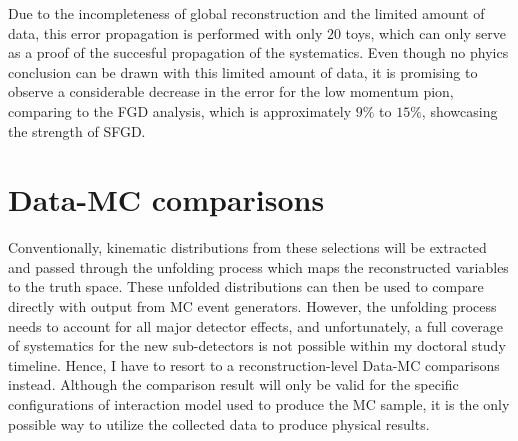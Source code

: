           Due to the incompleteness of global reconstruction and the limited amount of data, this error propagation is performed with only $20$ toys, which can only serve as a proof of the succesful propagation of the systematics.
          Even though no phyics conclusion can be drawn with this limited amount of data, it is promising to observe a considerable decrease in the error for the low momentum pion, comparing to the FGD analysis, which is approximately $9\%$ to $15\%$, showcasing the strength of SFGD.

     \section{Data-MC comparisons}
          Conventionally, kinematic distributions from these selections will be extracted and passed through the unfolding process which maps the reconstructed variables to the truth space. 
          These unfolded distributions can then be used to compare directly with output from MC event generators.
          However, the unfolding process needs to account for all major detector effects, and unfortunately, a full coverage of systematics for the new sub-detectors is not possible within my doctoral study timeline.
          Hence, I have to resort to a reconstruction-level Data-MC comparisons instead.
          Although the comparison result will only be valid for the specific configurations of interaction model used to produce the MC sample, it is the only possible way to utilize the collected data to produce physical results.
     
